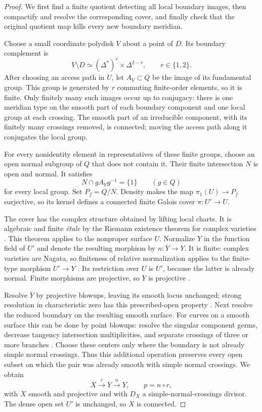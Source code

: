 \begin{proof}
We first find a finite quotient detecting all local boundary images,
then compactify and resolve the corresponding cover, and finally
check that the original quotient map kills every new boundary
meridian.

Choose a small coordinate polydisk $V$ about a point of $D$.  Its
boundary complement is
\[
  V\setminus D\simeq(\Delta^*)^r\times\Delta^{2-r},
  \qquad r\in\{1,2\}.
\]
After choosing an access path in $U$, let
$A_V\subset Q$ be the image of its fundamental group.  This group is
generated by $r$ commuting finite-order elements, so it is finite.
Only finitely many such images occur up to conjugacy: there is one
meridian type on the smooth part of each boundary component and one
local group at each crossing.  The smooth part of an irreducible
component, with its finitely many crossings removed, is connected;
moving the access path along it conjugates the local group.

For every nonidentity element in representatives of these finite
groups, choose an open normal subgroup of $Q$ that does not contain
it.  Their finite intersection $N$ is open and normal.  It satisfies
\begin{equation}
  N\cap gA_Vg^{-1}=\{1\}
  \qquad(g\in Q)
  \label{eq:local-detection}
\end{equation}
for every local group.  Set $P_f=Q/N$.  Density makes the map
$\pi_1(U)\to P_f$ surjective, so its kernel defines a connected
finite Galois cover $\pi:U'\to U$.

The cover has the complex structure obtained by lifting local charts.
It is algebraic and finite \emph{\'etale} by the Riemann existence
theorem for complex varieties
\citep[Expos\'e XII, Th\'eor\`eme 5.1]{SGA1}.  This theorem applies
to the nonproper surface $U$.  Normalize $Y$ in the function field of
$U'$ and denote the resulting morphism by $n:\overline Y\to Y$.
It is finite: complex varieties are Nagata, so finiteness of relative
normalization applies to the finite-type morphism $U'\to Y$
\citep[Tag 03GR]{StacksProject}.
Its restriction over $U$ is $U'$, because the latter is already normal.
Finite morphisms are projective, so $\overline Y$ is projective
\citep[Tag 0B3I]{StacksProject}.

Resolve $\overline Y$ by projective blowups, leaving its smooth locus
unchanged; strong resolution in characteristic zero has this
prescribed-open property \citep[pp.~822--823]{EncinasHauser2002}.
Next resolve the reduced boundary on the resulting smooth surface.
For curves on a smooth surface this can be done by point blowups:
resolve the singular component germs, decrease tangency intersection
multiplicities, and separate crossings of three or more branches
\citep[Tag 0BIC and its proof]{StacksProject}.
Choose these centers only where the boundary is not already simple
normal crossings.  Thus this additional operation preserves every
open subset on which the pair was already smooth with simple normal
crossings.  We obtain
\[
  X\xrightarrow{\ r\ }\overline Y
    \xrightarrow{\ n\ }Y,
  \qquad p=n\circ r,
\]
with $X$ smooth and projective and with $D_X$ a
simple-normal-crossings divisor.  The dense open set $U'$ is unchanged,
so $X$ is connected.


\end{proof}
